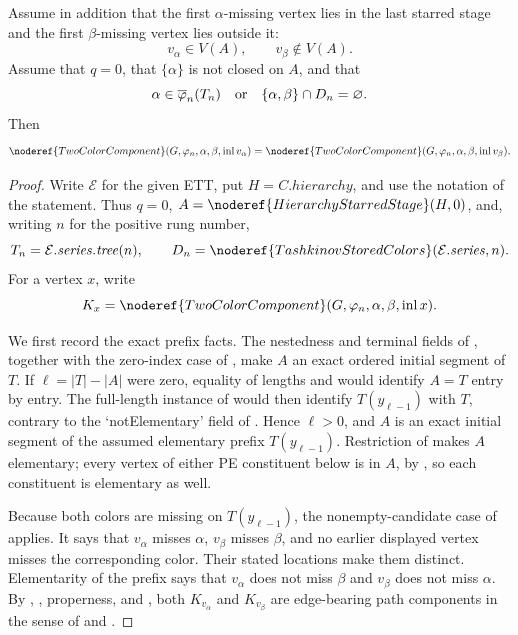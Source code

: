 \begin{lemma}
Assume in addition that the first $\alpha$-missing vertex lies in the
last starred stage and the first $\beta$-missing vertex lies outside it:
\[
        v_\alpha\in V(A),\qquad v_\beta\notin V(A).
\]
Assume that $q=0$, that $\{\alpha\}$ is not closed on $A$, and
that
\[
 \alpha\in\overline\varphi_n(T_n)
 \quad\hbox{or}\quad
 \{\alpha,\beta\}\cap D_n=\varnothing.
\]
Then
\[
 \noderef{TwoColorComponent}(G,\varphi_n,\alpha,\beta,
       \operatorname{inl}v_\alpha)
 =
 \noderef{TwoColorComponent}(G,\varphi_n,\alpha,\beta,
       \operatorname{inl}v_\beta).
\]
\end{lemma}
\begin{proof}
Write $\mathcal E$ for the given ETT, put $H=C.\mathit{hierarchy}$, and use
the notation of the statement.  Thus $q=0$,
$A=\noderef{HierarchyStarredStage}(H,0)$, and, writing $n$ for the positive
rung number,
\[
 T_n=\mathcal E.\mathit{series}.\mathit{tree}(n),\qquad
 D_n=\noderef{TashkinovStoredColors}(\mathcal E.\mathit{series},n).
\]
For a vertex $x$, write
\[
 K_x=\noderef{TwoColorComponent}
       (G,\varphi_n,\alpha,\beta,\operatorname{inl}x).
\]

We first record the exact prefix facts.  The nestedness and terminal fields
of , together with the zero-index case of
, make $A$ an exact ordered initial segment
of $T$.  If $\ell=|T|-|A|$ were zero, equality of lengths and
 would identify $A=T$ entry by entry.
The full-length instance of  would then identify
$T(y_{\ell-1})$ with $T$, contrary to the `notElementary' field of
.  Hence $\ell>0$, and $A$ is an exact
initial segment of the assumed elementary prefix $T(y_{\ell-1})$.
Restriction of  makes $A$ elementary;
every vertex of either PE constituent below is in $A$, by
, so each constituent is elementary as well.

Because both colors are missing on $T(y_{\ell-1})$, the nonempty-candidate
case of  applies.  It says that
$v_\alpha$ misses $\alpha$, $v_\beta$ misses $\beta$, and no earlier
displayed vertex misses the corresponding color.  Their stated locations
make them distinct.  Elementarity of the prefix says that $v_\alpha$ does
not miss $\beta$ and $v_\beta$ does not miss $\alpha$.  By
, , properness, and
, both $K_{v_\alpha}$ and
$K_{v_\beta}$ are edge-bearing path components in the sense of
 and
.


\end{proof}
